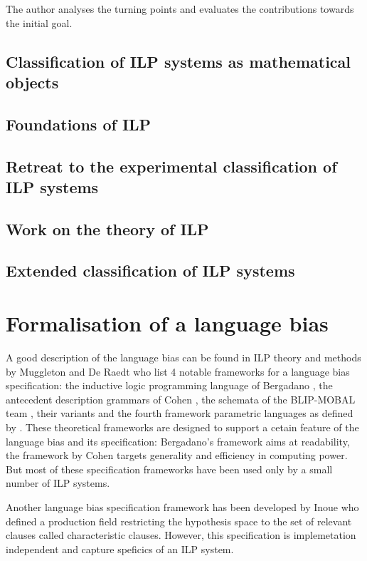 The author analyses the turning points and evaluates the contributions towards the initial goal.

\subsection{Classification of ILP systems as mathematical objects}
\subsection{Foundations of ILP}
\subsection{Retreat to the experimental classification of ILP systems}
\subsection{Work on the theory of ILP}
\subsection{Extended classification of ILP systems}

\section{Formalisation of a language bias}
A good description of the language bias can be found in ILP theory and methods by Muggleton and De Raedt \cite{muggleton1994inductive} who list 4 notable frameworks for a language bias specification: the inductive logic programming language of
Bergadano \cite{bergadano1993interactive}, the antecedent description grammars of Cohen \cite{cohen1994grammatically}\cite{cohen1992compiling}, the schemata of
the BLIP-MOBAL team \cite{emde1983discovery}\cite{kietz1992controlling}, their variants \cite{de1992interactive}\cite{silverstein1991relational}
\cite{tausend1994representing} and the fourth framework parametric languages as defined by \cite{muggleton1992efficient}\cite{de1992interactive}
\cite{buntine1987induction}\cite{cohen1993learnability}.
These theoretical frameworks are designed to support a cetain feature of the language bias and its specification: Bergadano's framework aims at readability, the framework by Cohen targets generality and efficiency in computing power.
But most of these specification frameworks have been used only by a small number of ILP systems.

Another language bias specification framework has been developed by Inoue \cite{inoue1992linear} who defined a production field restricting the hypothesis space to the set of relevant clauses called characteristic clauses. However, this specification is implemetation independent and capture speficics of an ILP system.


